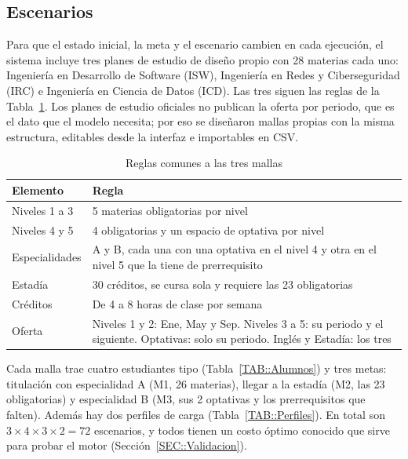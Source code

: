 \subsection{Escenarios}
Para que el estado inicial, la meta y el escenario cambien en cada ejecución, el sistema incluye tres planes de estudio de diseño propio con 28 materias cada uno: Ingeniería en Desarrollo de Software (ISW), Ingeniería en Redes y Ciberseguridad (IRC) e Ingeniería en Ciencia de Datos (ICD). Las tres siguen las reglas de la Tabla~\ref{TAB::Mallas}. Los planes de estudio oficiales no publican la oferta por periodo, que es el dato que el modelo necesita; por eso se diseñaron mallas propias con la misma estructura, editables desde la interfaz e importables en CSV.

\begin{table}[H]
  \begin{center}
    \caption{Reglas comunes a las tres mallas}
    \label{TAB::Mallas}
    \begin{tabular}{|| p{3cm} | p{9cm} ||}
        \hline
        Elemento & Regla \\ [0.5ex]
        \hline\hline
        Niveles 1 a 3 & 5 materias obligatorias por nivel \\
        \hline
        Niveles 4 y 5 & 4 obligatorias y un espacio de optativa por nivel \\
        \hline
        Especialidades & A y B, cada una con una optativa en el nivel 4 y otra en el nivel 5 que la tiene de prerrequisito \\
        \hline
        Estadía & 30 créditos, se cursa sola y requiere las 23 obligatorias \\
        \hline
        Créditos & De 4 a 8 horas de clase por semana \\
        \hline
        Oferta & Niveles 1 y 2: Ene, May y Sep. Niveles 3 a 5: su periodo y el siguiente. Optativas: solo su periodo. Inglés y Estadía: los tres \\
        \hline
    \end{tabular}
  \end{center}
\end{table}

Cada malla trae cuatro estudiantes tipo (Tabla~\ref{TAB::Alumnos}) y tres metas: titulación con especialidad A (M1, 26 materias), llegar a la estadía (M2, las 23 obligatorias) y especialidad B (M3, sus 2 optativas y los prerrequisitos que falten). Además hay dos perfiles de carga (Tabla~\ref{TAB::Perfiles}). En total son $3 \times 4 \times 3 \times 2 = 72$ escenarios, y todos tienen un costo óptimo conocido que sirve para probar el motor (Sección~\ref{SEC::Validacion}).

